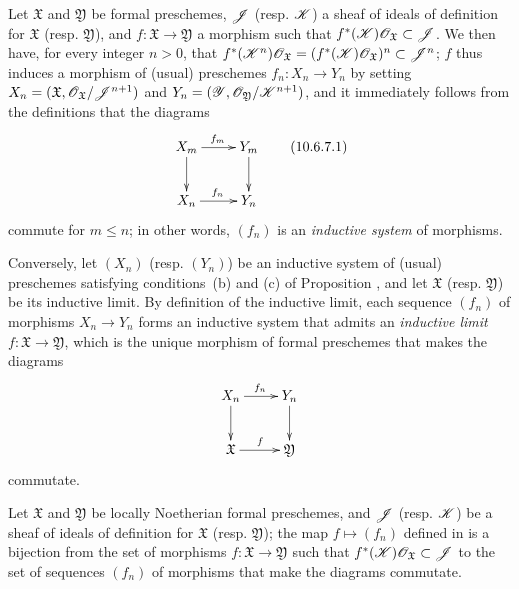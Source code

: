 \begin{env}[10.6.7]
\label{1.10.6.7}
Let $\mathfrak{X}$ and $\mathfrak{Y}$ be formal preschemes, $\mathscr{J}$ (resp. $\mathscr{K}$) a sheaf of ideals of definition for $\mathfrak{X}$ (resp. $\mathfrak{Y}$), and $f:\mathfrak{X}\to\mathfrak{Y}$ a morphism such that $f^*(\mathscr{K})\mathscr{O}_\mathfrak{X}\subset\mathscr{J}$.
We then have, for every integer $n>0$, that $f^*(\mathscr{K}^n)\mathscr{O}_\mathfrak{X}=(f^*(\mathscr{K})\mathscr{O}_\mathfrak{X})^n\subset\mathscr{J}^n$; $f$ thus induces  a morphism of (usual) preschemes $f_n:X_n\to Y_n$ by setting $X_n=(\mathfrak{X},\mathscr{O}_\mathfrak{X}/\mathscr{J}^{n+1})$ and $Y_n=(\mathscr{Y},\mathscr{O}_\mathfrak{Y}/\mathscr{K}^{n+1})$, and it immediately follows from the definitions that the diagrams
\begin{equation*}
\label{1.10.6.7.1}
  \xymatrix{
    X_m\ar[r]^{f_m}\ar[d] &
    Y_m\ar[d]\\
    X_n\ar[r]^{f_n} &
    Y_n
  }
  \tag{10.6.7.1}
\end{equation*}
commute for $m\leq n$; in other words, $(f_n)$ is an \emph{inductive system} of morphisms.
\end{env}

\begin{env}[10.6.8]
\label{1.10.6.8}
Conversely, let $(X_n)$ (resp. $(Y_n)$) be an inductive system of (usual) preschemes satisfying conditions~(b) and (c) of Proposition , and let $\mathfrak{X}$ (resp. $\mathfrak{Y}$) be its inductive limit.
By definition of the inductive limit, each sequence $(f_n)$ of morphisms $X_n\to Y_n$ forms an inductive system that admits an \emph{inductive limit $f:\mathfrak{X}\to\mathfrak{Y}$}, which is the unique morphism of formal preschemes that makes the diagrams
\[
  \xymatrix{
    X_n\ar[r]^{f_n}\ar[d] &
    Y_n\ar[d]\\
    \mathfrak{X}\ar[r]^f &
    \mathfrak{Y}
  }
\]
commutate.
\end{env}

\begin{proposition}[10.6.9]
\label{1.10.6.9}
Let $\mathfrak{X}$ and $\mathfrak{Y}$ be locally Noetherian formal preschemes, and $\mathscr{J}$ (resp. $\mathscr{K}$) be a sheaf of ideals of definition for $\mathfrak{X}$ (resp. $\mathfrak{Y}$); the map $f\mapsto(f_n)$ defined in  is a bijection from the set of morphisms $f:\mathfrak{X}\to\mathfrak{Y}$ such that $f^*(\mathscr{K})\mathscr{O}_\mathfrak{X}\subset\mathscr{J}$ to the set of sequences $(f_n)$ of morphisms that make the diagrams  commutate.
\end{proposition}

